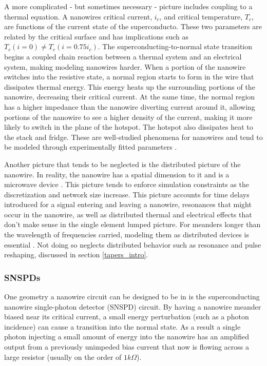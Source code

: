 A more complicated - but sometimes necessary - picture includes coupling to a thermal equation.
A nanowires critical current, $i_c$, and critical temperature, $T_c$, are
functions of the current state of the superconducto. These two parameters are related by the critical
surface and has implications such as $T_c(i=0) \neq T_c(i=0.75i_c)$. 
The superconducting-to-normal state transition
begins a coupled chain reaction between a thermal system and an electrical system, making
modeling nanowires harder. When a portion of the nanowire switches into the resistive 
state, a normal region starts to form in the wire that dissipates thermal energy. This
energy heats up the surrounding portions of the nanowire, decreasing their critical 
current. At the same time, the normal region has a higher impedance than the nanowire
diverting current around it, allowing portions of the nanowire to see a higher density of
the current, making it more likely to switch in the plane of the hotspot. The hotspot also
dissipates heat to the stack and fridge. These are well-studied phenomena for nanowires
and tend to be modeled through experimentally fitted parameters \cite{phen_model, karl_spice}. 

Another picture that tends to be neglected is the distributed picture of the nanowire.
In reality, the nanowire has a spatial dimension to it and is a microwave device
\cite{distributed_nanowire_model, santavicca_microwave}. This
picture tends to enforce simulation constraints as the discretization and network size
increase. This picture accounts for time delays introduced for a signal entering and
leaving a nanowire, resonances that might occur in the nanowire, as well as distributed
thermal and electrical effects that don't make sense in the single element lumped picture. For meanders
longer than the wavelength of frequencies carried, modeling them as distributed devices
is essential \cite{distributed_nanowire_model}. Not doing so neglects distributed behavior such as resonance and pulse reshaping, discussed in section \ref{tapers_intro}.



\subsubsection{SNSPDs}

One geometry a nanowire circuit can be designed to be in is the superconducting nanowire 
single-photon detector (SNSPD) circuit. By having a nanowire meander biased near
its critical current, a small energy perturbation (such as a photon incidence)
can cause a transition into the normal state. As a result a single photon injecting
a small amount of energy into the nanowire has an amplified output from a previously
unimpeded bias 
current that now is flowing across a large resistor (usually on the order of 
$1k\Omega$).

